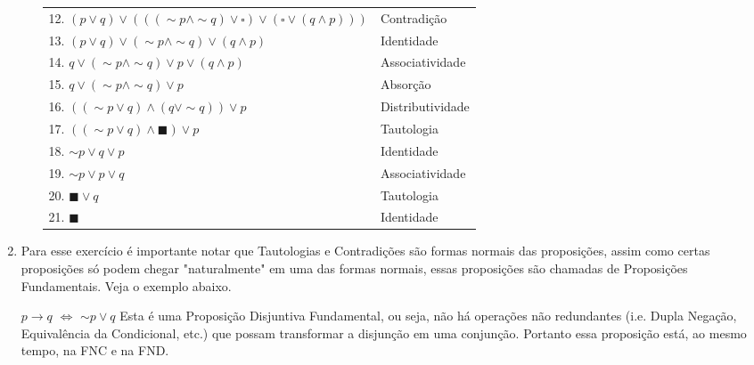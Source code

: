\documentclass[12pt, a4paper,final]{article}
\begin{document}
\begin{enumerate}
\begin{enumerate}[label=(\alph*)]
\begin{tabular}{ll}
                    12. $(p \vee q) \vee (((\sim p \wedge \sim q) \vee \square) \vee (\square \vee (q \wedge p)))$ & Contradição \\
                    13. $(p \vee q) \vee (\sim p \wedge \sim q) \vee (q \wedge p)$ & Identidade \\
                    14. $q \vee (\sim p \wedge \sim q) \vee p \vee (q \wedge p)$ & Associatividade \\
                    15. $q \vee (\sim p \wedge \sim q) \vee p$ & Absorção \\
                    16. $((\sim p \vee q) \wedge (q \vee \sim q)) \vee p$ & Distributividade \\
                    17. $((\sim p \vee q) \wedge \blacksquare) \vee p$ & Tautologia \\
                    18. $\sim p \vee q \vee p$ & Identidade \\
                    19. $\sim p \vee p \vee q$ & Associatividade \\
                    20. $\blacksquare \vee q$ & Tautologia \\
                    21. $\blacksquare$ & Identidade \\
                \end{tabular}
            
        \end{enumerate}
        
        \vskip 1cm
        
        \item Para esse exercício é importante notar que Tautologias e Contradições são formas normais
        das proposições, assim como certas proposições só podem chegar "naturalmente" em uma das formas normais, essas proposições são chamadas de Proposições Fundamentais. Veja o exemplo abaixo.
        
        \vskip 5mm
        
        $p \rightarrow q$ $\Leftrightarrow$ \newline
        $\sim p \vee q$ \newline
        Esta é uma Proposição Disjuntiva Fundamental, ou seja, não há operações não redundantes (i.e. Dupla Negação, Equivalência da Condicional, etc.) que possam transformar a disjunção em uma conjunção. Portanto essa proposição está, ao mesmo tempo, na FNC e na FND.
        
        \vskip 5mm
        
        \begin{enumerate}[label=(\alph*), leftmargin = 5mm]
            \setlength {\itemsep}{1em}
            \setlength {\itemindent}{-2cm}
            

\end{enumerate}
\end{enumerate}
\end{document}
